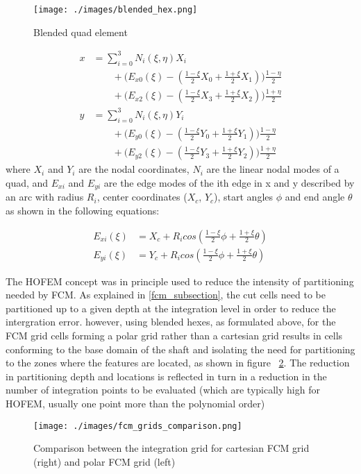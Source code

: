\begin{figure}
  \begin{center}
    \texttt{[image: ./images/blended\_hex.png]}
    \caption{Blended quad element}
    \label{fig:blended_hex}
  \end{center}
\end{figure}

\begin{subequations}
\label{eq:blended_hex}
\begin{align}
  x &= \sum_{i = 0}^3 N_i(\xi, \eta) X_i \nonumber \\
    &\qquad {} + \big( E_{x0}(\xi) - ( \frac{1-\xi}{2}X_0 + \frac{1+\xi}{2}X_1 ) ) \frac{1-\eta}{2} \nonumber \\
    &\qquad {} + \big( E_{x2}(\xi) - ( \frac{1-\xi}{2}X_3 + \frac{1+\xi}{2}X_2 ) ) \frac{1+\eta}{2} \\
  y &= \sum_{i = 0}^3 N_i(\xi, \eta) Y_i \nonumber \\
    &\qquad {} + \big( E_{y0}(\xi) - ( \frac{1-\xi}{2}Y_0 + \frac{1+\xi}{2}Y_1 ) ) \frac{1-\eta}{2} \nonumber \\
    &\qquad {} + \big( E_{y2}(\xi) - ( \frac{1-\xi}{2}Y_3 + \frac{1+\xi}{2}Y_2 ) ) \frac{1+\eta}{2}
\end{align}
\end{subequations}
where $X_i$ and $Y_i$ are the nodal coordinates, $N_i$ are the linear nodal modes of a quad, and $E_{xi}$ and $E_{yi}$ are the edge modes of the ith edge in x and y described by an arc with radius $R_i$, center coordinates ($X_c$, $Y_c$), start angles $\phi$ and end angle $\theta$ as shown in the following equations:

\begin{subequations}
\label{eq:edge_modes_hex}
\begin{align}
      E_{xi}(\xi) &= X_c + R_i cos( \frac{1-\xi}{2}\phi + \frac{1+\xi}{2}\theta ) \\
      E_{yi}(\xi) &= Y_c + R_i cos( \frac{1-\xi}{2}\phi + \frac{1+\xi}{2}\theta )
\end{align}
\end{subequations}

The HOFEM concept was in principle used to reduce the intensity of partitioning needed by FCM. As explained in \ref{fcm_subsection}, the cut cells need to be partitioned up to a given depth at the integration level in order to reduce the intergration error. however, using blended hexes, as formulated above, for the FCM grid cells forming a polar grid rather than a cartesian grid results in cells conforming to the base domain of the shaft and isolating the need for partitioning to the zones where the features are located, as shown in figure ~\ref{fig:fcm_grids_comparison}. The reduction in partitioning depth and locations is reflected in turn in a reduction in the number of integration points to be evaluated (which are typically high for HOFEM, usually one point more than the polynomial order)

\begin{figure}
  \begin{center}
    \texttt{[image: ./images/fcm\_grids\_comparison.png]}
    \caption{Comparison between the integration grid for cartesian FCM grid (right) and polar FCM grid (left)}
    \label{fig:fcm_grids_comparison}
  \end{center}
\end{figure}

